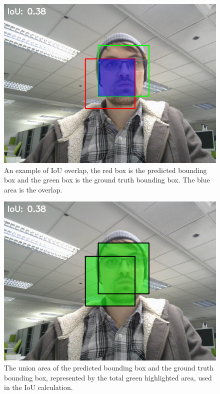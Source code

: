 \begin{figure}[!htb]
    \centering{}
    \includegraphics[scale=0.35]{fed_images/iou_overlap.png}
    \caption{An example of IoU overlap, the red box is the predicted bounding box and the green box is the ground truth bounding box. The blue area is the overlap.}
    \label{figure:iou}
\end{figure}

\begin{figure}[!htb]
    \centering{}
    \includegraphics[scale=0.35]{fed_images/iou_individual_boxes.png}
    \caption{The union area of the predicted bounding box and the ground truth bounding box, represented by the total green highlighted area, used in the IoU calculation.}
    \label{figure:union}
\end{figure}

